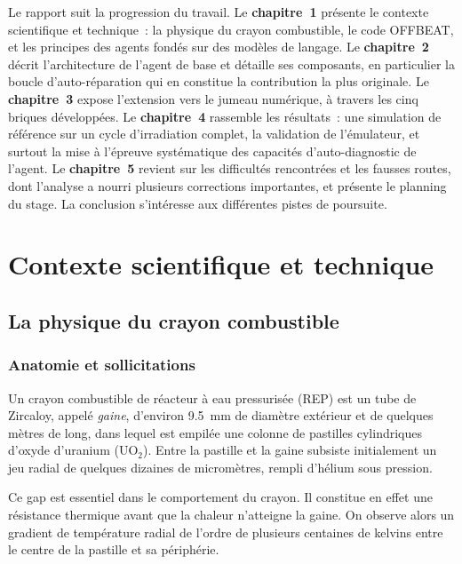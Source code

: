 \documentclass[12pt,a4paper,french]{report}
\begin{document}
Le rapport suit la progression du travail. Le \textbf{chapitre~1} présente le
contexte scientifique et technique~: la physique du crayon combustible, le code
OFFBEAT, et les principes des agents fondés sur des modèles de langage. Le \textbf{chapitre~2} décrit
l'architecture de l'agent de base et détaille ses composants, en particulier la
boucle d'auto-réparation qui en constitue la contribution la plus originale. Le
\textbf{chapitre~3} expose l'extension vers le jumeau numérique, à travers les
cinq briques développées. Le \textbf{chapitre~4} rassemble les résultats~: une
simulation de référence sur un cycle d'irradiation complet, la validation de
l'émulateur, et surtout la mise à l'épreuve systématique des capacités
d'auto-diagnostic de l'agent. Le \textbf{chapitre~5} revient sur les difficultés
rencontrées et les fausses routes, dont l'analyse a nourri plusieurs
corrections importantes, et présente le planning du stage. La conclusion s'intéresse aux différentes pistes de poursuite.

\clearpage

\chapter{Contexte scientifique et technique}

\section{La physique du crayon combustible}

\subsection{Anatomie et sollicitations}

Un crayon combustible de réacteur à eau pressurisée (REP) est un tube de
Zircaloy, appelé \textit{gaine}, d'environ \SI{9.5}{\milli\metre} de diamètre
extérieur et de quelques mètres de long, dans lequel est empilée une colonne de
pastilles cylindriques d'oxyde d'uranium ($\mathrm{UO_2}$). Entre la pastille et
la gaine subsiste initialement un jeu radial de quelques
dizaines de micromètres, rempli d'hélium sous pression.

Ce gap est essentiel dans le comportement du crayon. Il
constitue en effet une résistance thermique avant que la chaleur n'atteigne la gaine. On observe alors un gradient de température radial de l'ordre de plusieurs
centaines de kelvins entre le centre de la pastille et sa périphérie.
\end{document}
